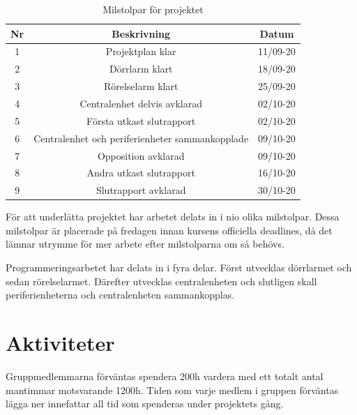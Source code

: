 \documentclass[a4paper]{article}
\begin{document}
\begin{table}[H]
    \centering
        \begin{tabular}{ |c|c|c| }\hline
            Nr & Beskrivning & Datum \\\hline\hline
            1 & Projektplan klar & 11/09-20 \\\hline
            2 & Dörrlarm klart & 18/09-20 \\\hline
            3 & Rörelselarm klart & 25/09-20 \\\hline
            4 & Centralenhet delvis avklarad & 02/10-20 \\\hline
            5 & Första utkast slutrapport & 02/10-20 \\\hline
            6 & Centralenhet och periferienheter sammankopplade & 09/10-20 \\\hline
            7 & Opposition avklarad & 09/10-20 \\\hline
            8 & Andra utkast slutrapport & 16/10-20 \\\hline
            9 & Slutrapport avklarad & 30/10-20 \\\hline
        \end{tabular}
        \caption{Milstolpar för projektet}
        \label{table:milstolpar}
\end{table}

För att underlätta projektet har arbetet delats in i nio olika milstolpar. Dessa milstolpar är placerade på fredagen innan kursens officiella deadlines, då det lämnar utrymme för mer arbete efter milstolparna om så behövs. 

Programmeringsarbetet har delats in i fyra delar. Först utvecklas dörrlarmet och sedan rörelselarmet. Därefter utvecklas centralenheten och slutligen skall periferienheterna och centralenheten sammankopplas. 

\section{Aktiviteter}

Gruppmedlemmarna förväntas spendera 200h vardera med ett totalt antal mantimmar motsvarande 1200h. Tiden som varje medlem i gruppen förväntas lägga ner innefattar all tid som spenderas under projektets gång.
\end{document}
